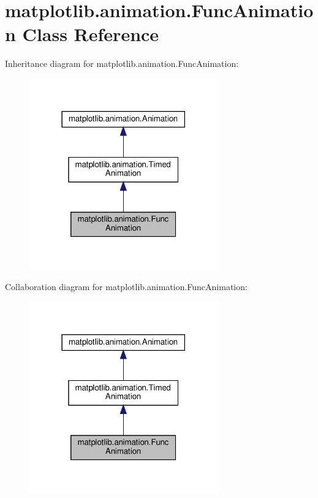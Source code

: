 \hypertarget{classmatplotlib_1_1animation_1_1FuncAnimation}{}\section{matplotlib.\+animation.\+Func\+Animation Class Reference}
\label{classmatplotlib_1_1animation_1_1FuncAnimation}


Inheritance diagram for matplotlib.\+animation.\+Func\+Animation\+:
\nopagebreak
\begin{figure}[H]
\begin{center}
\leavevmode
\includegraphics[width=230pt]{classmatplotlib_1_1animation_1_1FuncAnimation__inherit__graph}
\end{center}
\end{figure}


Collaboration diagram for matplotlib.\+animation.\+Func\+Animation\+:
\nopagebreak
\begin{figure}[H]
\begin{center}
\leavevmode
\includegraphics[width=230pt]{classmatplotlib_1_1animation_1_1FuncAnimation__coll__graph}
\end{center}
\end{figure}
